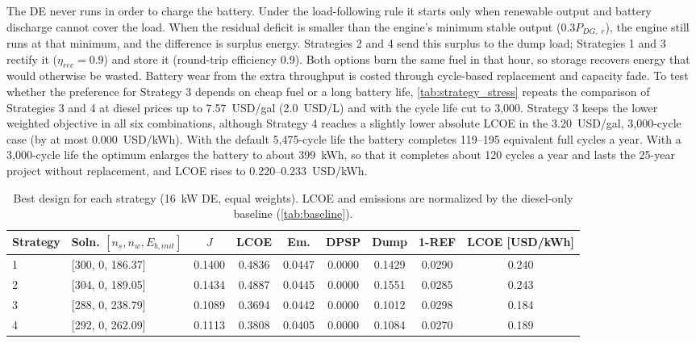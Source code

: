 \documentclass[final,3p,times]{elsarticle}
\begin{document}
The DE never runs in order to charge the battery. Under the load-following rule it starts only when renewable output and battery discharge cannot cover the load. When the residual deficit is smaller than the engine's minimum stable output ($0.3P_{DG,\;r}$), the engine still runs at that minimum, and the difference is surplus energy. Strategies 2 and 4 send this surplus to the dump load; Strategies 1 and 3 rectify it ($\eta_{rec} = 0.9$) and store it (round-trip efficiency 0.9). Both options burn the same fuel in that hour, so storage recovers energy that would otherwise be wasted. Battery wear from the extra throughput is costed through cycle-based replacement and capacity fade. To test whether the preference for Strategy 3 depends on cheap fuel or a long battery life, \cref{tab:strategy_stress} repeats the comparison of Strategies 3 and 4 at diesel prices up to 7.57~USD/gal (2.0~USD/L) and with the cycle life cut to 3,000. Strategy 3 keeps the lower weighted objective in all six combinations, although Strategy 4 reaches a slightly lower absolute LCOE in the 3.20~USD/gal, 3,000-cycle case (by at most 0.000~USD/kWh). With the default 5,475-cycle life the battery completes 119--195 equivalent full cycles a year. With a 3,000-cycle life the optimum enlarges the battery to about 399~kWh, so that it completes about 120 cycles a year and lasts the 25-year project without replacement, and LCOE rises to 0.220--0.233~USD/kWh.

\begin{table}[htbp]
\centering
\small
\begin{tabular}{l l c c c c c c c}
\toprule
\textbf{Strategy} & \textbf{Soln. $[n_s, n_w, E_{b,init}]$} & \textbf{$J$} & \textbf{LCOE} & \textbf{Em.} & \textbf{DPSP} & \textbf{Dump} & \textbf{1-REF} & \textbf{LCOE [USD/kWh]} \\
\midrule
1 & [300, 0, 186.37] & 0.1400 & 0.4836 & 0.0447 & 0.0000 & 0.1429 & 0.0290 & 0.240 \\
2 & [304, 0, 189.05] & 0.1434 & 0.4887 & 0.0445 & 0.0000 & 0.1551 & 0.0285 & 0.243 \\
3 & [288, 0, 238.79] & 0.1089 & 0.3694 & 0.0442 & 0.0000 & 0.1012 & 0.0298 & 0.184 \\
4 & [292, 0, 262.09] & 0.1113 & 0.3808 & 0.0405 & 0.0000 & 0.1084 & 0.0270 & 0.189 \\
\bottomrule
\end{tabular}
\caption{\label{tab:strat} Best design for each strategy (16~kW DE, equal weights). LCOE and emissions are normalized by the diesel-only baseline (\cref{tab:baseline}).}
\end{table}
\end{document}
